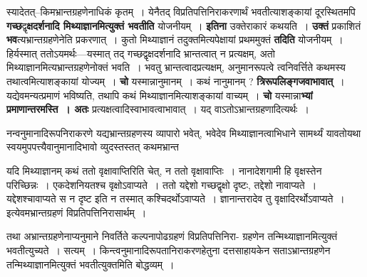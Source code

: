 \documentclass[article,12pt,a4paper]{memoir}
\begin{document}
	  \pstart स्यादेतत्--किमभ्रान्तग्रहणेनाधिकं कृतम् । येनैतद् विप्रतिपत्तिनिराकरणार्थं भवतीत्याशङ्कायां दूरस्थितमपि \textbf{गच्छ}द्वृ\textbf{क्षदर्शनादि मिथ्याज्ञानमित्युक्तं भवतीति} योजनीयम् । \textbf{इतिना} उक्तेराकारं कथयति । \textbf{उक्तं} प्रकाशितं \textbf{भव}त्यभ्रान्तग्रहणेनेति प्रकरणात् । कुतो मिथ्याज्ञानं तदुक्तमित्यपेक्षायां प्रथममुक्तं \textbf{तदिति} योजनीयम् । हिर्यस्मात् ततोऽयमर्थः—यस्मात् तद् गच्छद्वृक्षदर्शनादि भ्रान्तत्वात् न प्रत्यक्षम्, अतो मिथ्याज्ञानमित्यभ्रान्तग्रहणेनोक्तं भवति । भवतु भ्रान्तत्वादप्रत्यक्षम्, अनुमानरूपत्वे त्वनिवर्त्तिते कथमस्य तथात्वमित्याशङ्कायां योज्यम् । \textbf{चो} यस्मान्नानुमानम् । कथं नानुमानम् ? \textbf{त्रिरूपलिङ्गजवाभावात्} । यद्येवमन्यत्प्रमाणं भविष्यति, तथापि कथं मिथ्याज्ञानमित्याशङ्कायां वाच्यम् । \textbf{चो} यस्मान्ना\textbf{भ्यां प्रमाणान्तरमस्ति । अतः} प्रत्यक्षत्वादिस्वाभावत्वाभावात् । यद् वाऽतोऽभ्रान्तग्रहणादित्यर्थः ।
	\pend
      

	  \pstart नन्वनुमानादिरूपनिराकरणे यद्यभ्रान्तग्रहणस्य व्यापारो भवेत्, भवेदेव मिथ्याज्ञानत्वाभिधाने सामर्थ्यं यावतोयथा स्वयमुपपत्त्यैवानुमानादिभावो व्युदस्तस्तत् कथमभ्रान्त \leavevmode{} 
	  
	यदि मिथ्याज्ञानम् कथं ततो वृक्षावाप्तिरिति चेत्, न ततो वृक्षावाप्तिः । नानादेशगामी हि वृक्षस्तेन परिच्छिन्नः । एकदेशनियतश्च वृक्षोऽवाप्यते । ततो यद्देशो गच्छद्वृक्षो दृष्टः, तद्देशो नावाप्यते । यद्देशश्चावाप्यते स न दृष्ट इति न तस्मात् कश्चिदर्थोऽवाप्यते । ज्ञानान्तरादेव तु वृक्षादिरर्थोऽवाप्यते । इत्येवमभ्रान्तग्रहणं विप्रतिपत्तिनिरासार्थम् ।  
	  
	तथा अभ्रान्तग्रहणेनाप्यनुमाने निवर्तिते कल्पनापोढग्रहणं विप्रतिपत्तिनिरा- ग्रहणेन तन्मिथ्याज्ञानमित्युक्तं भवतीत्युच्यते । सत्यम् । किन्त्वनुमानादिरूपतानिराकरणहेतुना दत्तसाहायकेन सताऽभ्रान्तग्रहणेन तन्मिथ्याज्ञानमित्युक्तं भवतीत्युक्तमिति बोद्धव्यम् ।
	\pend
      
\end{document}

